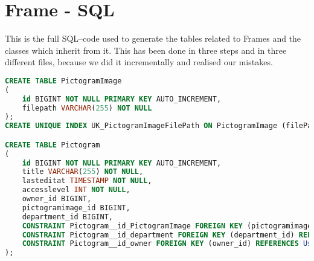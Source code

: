 \chapter{Frame - SQL}\label{app:frames}
This is the full SQL--code used to generate the tables related to Frames and the classes which inherit from it. 
This has been done in three steps and in three different files, because we did it incrementally and realised our mistakes.

\begin{lstlisting}[language=sql]
CREATE TABLE PictogramImage
(
    id BIGINT NOT NULL PRIMARY KEY AUTO_INCREMENT,
    filepath VARCHAR(255) NOT NULL
);
CREATE UNIQUE INDEX UK_PictogramImageFilePath ON PictogramImage (filePath);

CREATE TABLE Pictogram
(
    id BIGINT NOT NULL PRIMARY KEY AUTO_INCREMENT,
    title VARCHAR(255) NOT NULL,
    lasteditat TIMESTAMP NOT NULL,
    accesslevel INT NOT NULL,
    owner_id BIGINT,
    pictogramimage_id BIGINT,
    department_id BIGINT,
    CONSTRAINT Pictogram__id_PictogramImage FOREIGN KEY (pictogramimage_id) REFERENCES PictogramImage (id),
    CONSTRAINT Pictogram__id_department FOREIGN KEY (department_id) REFERENCES Department (id),
    CONSTRAINT Pictogram__id_owner FOREIGN KEY (owner_id) REFERENCES User (id)
);
\end{lstlisting}


